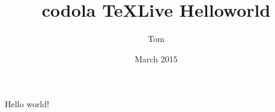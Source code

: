 \documentclass{article}
\title{codola TeXLive Helloworld}
\author{Tom}
\date{March 2015}
\begin{document}
   \maketitle
   Hello world!
\end{document}
